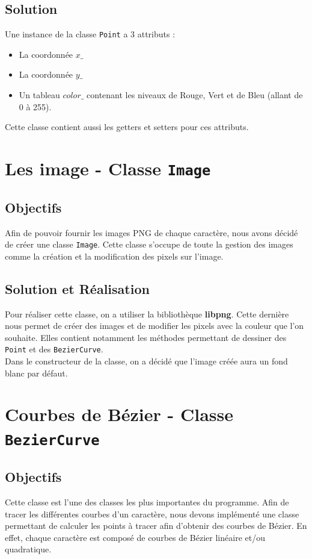 \documentclass[a4paper, 12pt]{article}
\begin{document}
\subsection{Solution}
Une instance de la classe \texttt{Point} a 3 attributs : 
\begin{itemize}
\item La coordonnée $x\_$
\item La coordonnée $y\_$
\item Un tableau $color\_$ contenant les niveaux de Rouge, Vert et de Bleu (allant de 0 à 255). 
\end{itemize}
Cette classe contient aussi les getters et setters pour ces attributs.

\section{Les image - Classe \texttt{Image}}	
\subsection{Objectifs}
Afin de pouvoir fournir les images PNG de chaque caractère, nous avons décidé de créer une classe \texttt{Image}. Cette classe s'occupe de toute la gestion des images comme la création et la modification des pixels sur l'image.

\subsection{Solution et Réalisation}
Pour réaliser cette classe, on a utiliser la bibliothèque \textbf{libpng}. Cette dernière nous permet de créer des images et de modifier les pixels avec la couleur que l'on souhaite.
Elles contient notamment les méthodes permettant de dessiner des \texttt{Point} et des \texttt{BezierCurve}.\\

Dans le constructeur de la classe, on a décidé que l'image créée aura un fond blanc par défaut. 


\section{Courbes de Bézier - Classe \texttt{BezierCurve}}	
\subsection{Objectifs	}
Cette classe est l’une des classes les plus importantes du programme. Afin de tracer les différentes courbes d’un caractère, nous devons implémenté une classe permettant de calculer les points à tracer afin d'obtenir des courbes de Bézier. En effet, chaque caractère est composé de courbes de Bézier linéaire et/ou quadratique.
\end{document}
